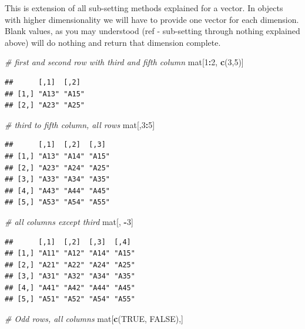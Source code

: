 \documentclass[
]{book}
\newenvironment{Shaded}{\begin{snugshade}}{\end{snugshade}}
\newcommand{\CommentTok}[1]{\textcolor[rgb]{0.56,0.35,0.01}{\textit{#1}}}
\newcommand{\ConstantTok}[1]{\textcolor[rgb]{0.56,0.35,0.01}{#1}}
\newcommand{\DecValTok}[1]{\textcolor[rgb]{0.00,0.00,0.81}{#1}}
\newcommand{\FunctionTok}[1]{\textcolor[rgb]{0.13,0.29,0.53}{\textbf{#1}}}
\newcommand{\NormalTok}[1]{#1}
\newcommand{\SpecialCharTok}[1]{\textcolor[rgb]{0.81,0.36,0.00}{\textbf{#1}}}
\begin{document}
This is extension of all sub-setting methods explained for a vector. In objects with higher dimensionality we will have to provide one vector for each dimension. Blank values, as you may understood (ref - sub-setting through nothing explained above) will do nothing and return that dimension complete.

\begin{Shaded}
\begin{Highlighting}[]
\CommentTok{\# first and second row with third and fifth column}
\NormalTok{mat[}\DecValTok{1}\SpecialCharTok{:}\DecValTok{2}\NormalTok{, }\FunctionTok{c}\NormalTok{(}\DecValTok{3}\NormalTok{,}\DecValTok{5}\NormalTok{)]}
\end{Highlighting}
\end{Shaded}

\begin{verbatim}
##      [,1]  [,2] 
## [1,] "A13" "A15"
## [2,] "A23" "A25"
\end{verbatim}

\begin{Shaded}
\begin{Highlighting}[]
\CommentTok{\# third to fifth column, all rows}
\NormalTok{mat[,}\DecValTok{3}\SpecialCharTok{:}\DecValTok{5}\NormalTok{]}
\end{Highlighting}
\end{Shaded}

\begin{verbatim}
##      [,1]  [,2]  [,3] 
## [1,] "A13" "A14" "A15"
## [2,] "A23" "A24" "A25"
## [3,] "A33" "A34" "A35"
## [4,] "A43" "A44" "A45"
## [5,] "A53" "A54" "A55"
\end{verbatim}

\begin{Shaded}
\begin{Highlighting}[]
\CommentTok{\# all columns except third}
\NormalTok{mat[, }\SpecialCharTok{{-}}\DecValTok{3}\NormalTok{]}
\end{Highlighting}
\end{Shaded}

\begin{verbatim}
##      [,1]  [,2]  [,3]  [,4] 
## [1,] "A11" "A12" "A14" "A15"
## [2,] "A21" "A22" "A24" "A25"
## [3,] "A31" "A32" "A34" "A35"
## [4,] "A41" "A42" "A44" "A45"
## [5,] "A51" "A52" "A54" "A55"
\end{verbatim}

\begin{Shaded}
\begin{Highlighting}[]
\CommentTok{\# Odd rows, all columns}
\NormalTok{mat[}\FunctionTok{c}\NormalTok{(}\ConstantTok{TRUE}\NormalTok{, }\ConstantTok{FALSE}\NormalTok{),]}
\end{Highlighting}
\end{Shaded}
\end{document}
